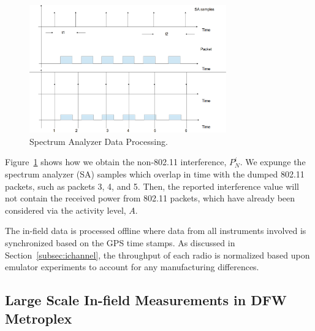 \begin{figure} 
\centering
\includegraphics[width=85mm]{figures/sa_process}
\vspace{-0.1in}
\caption{Spectrum Analyzer Data Processing.}
\label{fig:sa_process}
\vspace{0.1in}
\end{figure}

Figure~\ref{fig:sa_process} shows how we obtain the
non-802.11 interference, $P_N^i$. We expunge the spectrum analyzer
(SA) samples which overlap in time with the dumped 802.11 packets,
such as packets 3, 4, and 5. Then, the reported interference value
will not contain the received power from 802.11 packets, which have
already been considered via the activity level, $A$.

The in-field data is processed offline where data from all instruments
involved is synchronized based on the GPS time stamps. 
As discussed in Section~\ref{subsec:ichannel}, the throughput of each radio
is normalized based upon emulator experiments to account for any
manufacturing differences.



\subsection{Large Scale In-field Measurements in DFW Metroplex}

